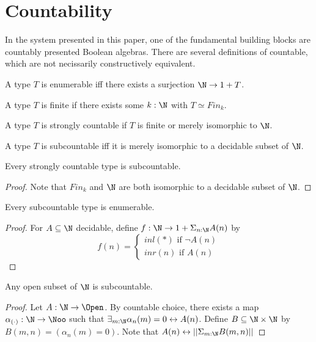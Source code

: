 \section{Countability}\label{CountabilityDiscussion}
In the system presented in this paper, 
one of the fundamental building blocks are countably presented Boolean algebras. 
There are several definitions of countable, which are not necissarily constructively equivalent. 

\begin{definition}
  A type $T$ is enumerable iff there exists a surjection $\N \to 1 + T$. 
\end{definition}
\begin{definition}\label{dfnFinite}
  A type $T$ is finite if there exists some $k:\N$ with $T\simeq Fin_k$. 
\end{definition}
\begin{definition}
  A type $T$ is strongly countable if
  $T$ is finite or merely isomorphic to $\N$.
\end{definition}
\begin{definition}
  A type $T$ is subcountable iff it is merely isomorphic to a decidable subset of $\N$. 
\end{definition}


\begin{lemma}
  Every strongly countable type is subcountable. 
\end{lemma}
\begin{proof}
  Note that $Fin_k$ and $\N$ are both isomorphic to a decidable subset of $\N$. 
\end{proof}
\begin{lemma}
  Every subcountable type is enumerable. 
\end{lemma}
\begin{proof}
  For $A\subseteq \N$ decidable, define $f:\N \to 1 + \Sigma_{n:\N} A(n)$ by 
  $$
  f(n) = 
  \begin{cases}
    inl(*) \text{ if } \neg A(n)\\
    inr(n) \text{ if } A(n)
  \end{cases}
  $$
\end{proof} 


\begin{lemma}\label{OpenSubsetNAreSubCountable}
  Any open subset of $\N$ is subcountable. 
\end{lemma} 
\begin{proof}
  Let $A:\N \to \Open$. 
  By countable choice, there exists a map $\alpha_{(\cdot)}:\N \to \Noo$ such that 
  $\exists_{m:\N} \alpha_n(m) = 0 \leftrightarrow A (n)$. 
  Define $B\subseteq \N \times \N$ by 
  $B(m,n) = (\alpha_{n}(m) = 0)$. 
  Note that $A(n) \leftrightarrow || \Sigma_{m:\N } B(m,n) ||$
\end{proof}

